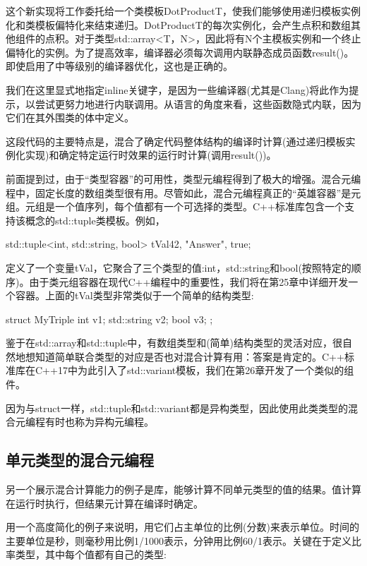 这个新实现将工作委托给一个类模板DotProductT，使我们能够使用递归模板实例化和类模板偏特化来结束递归。DotProductT的每次实例化，会产生点积和数组其他组件的点积。对于类型std::array<T，N>，因此将有N个主模板实例和一个终止偏特化的实例。为了提高效率，编译器必须每次调用内联静态成员函数result()。即使启用了中等级别的编译器优化，这也是正确的。

\begin{notice}我们在这里显式地指定inline关键字，是因为一些编译器(尤其是Clang)将此作为提示，以尝试更努力地进行内联调用。从语言的角度来看，这些函数隐式内联，因为它们在其外围类的体中定义。
\end{notice}

这段代码的主要特点是，混合了确定代码整体结构的编译时计算(通过递归模板实例化实现)和确定特定运行时效果的运行时计算(调用result())。

前面提到过，由于“类型容器”的可用性，类型元编程得到了极大的增强。混合元编程中，固定长度的数组类型很有用。尽管如此，混合元编程真正的“英雄容器”是元组。元组是一个值序列，每个值都有一个可选择的类型。C++标准库包含一个支持该概念的std::tuple类模板。例如，

\begin{cpp}
std::tuple<int, std::string, bool> tVal{42, "Answer", true};
\end{cpp}

定义了一个变量tVal，它聚合了三个类型的值:int，std::string和bool(按照特定的顺序)。由于类元组容器在现代C++编程中的重要性，我们将在第25章中详细开发一个容器。上面的tVal类型非常类似于一个简单的结构类型:

\begin{cpp}
struct MyTriple {
	int v1;
	std::string v2;
	bool v3;
};
\end{cpp}

鉴于在std::array和std::tuple中，有数组类型和(简单)结构类型的灵活对应，很自然地想知道简单联合类型的对应是否也对混合计算有用：答案是肯定的。C++标准库在C++17中为此引入了std::variant模板，我们在第26章开发了一个类似的组件。

因为与struct一样，std::tuple和std::variant都是异构类型，因此使用此类类型的混合元编程有时也称为异构元编程。

\subsection{单元类型的混合元编程}

另一个展示混合计算能力的例子是库，能够计算不同单元类型的值的结果。值计算在运行时执行，但结果元计算在编译时确定。

用一个高度简化的例子来说明，用它们占主单位的比例(分数)来表示单位。时间的主要单位是秒，则毫秒用比例1/1000表示，分钟用比例60/1表示。关键在于定义比率类型，其中每个值都有自己的类型:

